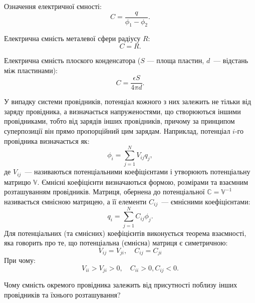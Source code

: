 \begin{Theory}\small
	Означення електричної ємності:
	\begin{equation}\label{capacity}
		C = \frac{q}{\phi_1 - \phi_2}.
	\end{equation}

	Електрична ємність металевої сфери радіусу $R$:
	\begin{equation}\label{sphere_capacity}
		C = R.
	\end{equation}

	Електрична ємність плоского конденсатора ($S$ --- площа пластин, $d$~--- відстань між пластинами):
	\begin{equation}\label{condensator_capacity}
	C = \frac{\epsilon S}{4\pi d}.
	\end{equation}

	У випадку системи провідників, потенціал кожного з них залежить не тільки від заряду провідника, а визначається напруженостями, що створюються іншими провідниками, тобто від зарядів інших провідників, причому за принципом суперпозиції він прямо пропорційний цим зарядам. Наприклад, потенціал $i$-го провідника визначається як:
	\begin{equation}
		\phi_i = \sum\limits_{j=1}^{N}V_{ij} q_j,
	\end{equation}
	де $V_{ij}$~--- називаються потенціальними коефіцієнтами і утворюють потенціальну матрицю $\mathbb{V}$. Ємнісні коефіцієнти визначаються формою, розмірами та взаємним розташуванням провідників. Матриця, обернена до потенціальної $\mathbb{C} = \mathbb{V}^{-1}$ називається ємнісною матрицею, а її елементи $C_{ij}$~--- ємнісними коефіцієнтами:
	\begin{equation}\label{}
		q_i = \sum\limits_{j=1}^{N}C_{ij} \phi_j.
	\end{equation}
	Для потенціальних (та ємнісних) коефіцієнтів виконується теорема взаємності, яка говорить про те, що потенціальна (ємнісна) матриця є симетричною:
	\begin{equation*}\label{}
		V_{ij} = V_{ji}, \quad C_{ij} = C_{ji}
	\end{equation*}
	При чому:
	\begin{equation}\label{}
			V_{ii} > V_{ji} > 0, \quad C_{ii} >0, C_{ij}<0.
	\end{equation}
\end{Theory}

\begin{problem}
    Чому ємність окремого провідника залежить від присутності поблизу інших провідників та їхнього розташування?

\end{problem}

